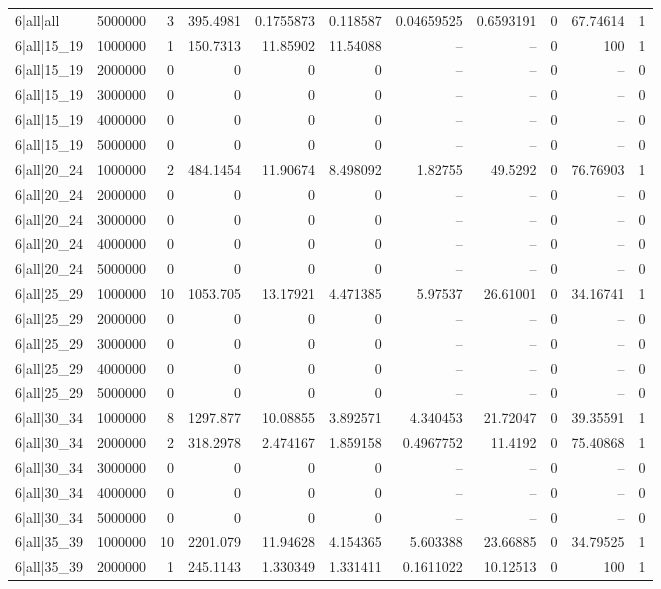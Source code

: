 \begin{tabular}{lrrrrrrrrrr}
6|all|all & 5000000 & 3 & 395.4981 & 0.1755873 & 0.118587 & 0.04659525 & 0.6593191 & 0 & 67.74614 & 1 \\
6|all|15\_19 & 1000000 & 1 & 150.7313 & 11.85902 & 11.54088 & -- & -- & 0 & 100 & 1 \\
6|all|15\_19 & 2000000 & 0 & 0 & 0 & 0 & -- & -- & 0 & -- & 0 \\
6|all|15\_19 & 3000000 & 0 & 0 & 0 & 0 & -- & -- & 0 & -- & 0 \\
6|all|15\_19 & 4000000 & 0 & 0 & 0 & 0 & -- & -- & 0 & -- & 0 \\
6|all|15\_19 & 5000000 & 0 & 0 & 0 & 0 & -- & -- & 0 & -- & 0 \\
6|all|20\_24 & 1000000 & 2 & 484.1454 & 11.90674 & 8.498092 & 1.82755 & 49.5292 & 0 & 76.76903 & 1 \\
6|all|20\_24 & 2000000 & 0 & 0 & 0 & 0 & -- & -- & 0 & -- & 0 \\
6|all|20\_24 & 3000000 & 0 & 0 & 0 & 0 & -- & -- & 0 & -- & 0 \\
6|all|20\_24 & 4000000 & 0 & 0 & 0 & 0 & -- & -- & 0 & -- & 0 \\
6|all|20\_24 & 5000000 & 0 & 0 & 0 & 0 & -- & -- & 0 & -- & 0 \\
6|all|25\_29 & 1000000 & 10 & 1053.705 & 13.17921 & 4.471385 & 5.97537 & 26.61001 & 0 & 34.16741 & 1 \\
6|all|25\_29 & 2000000 & 0 & 0 & 0 & 0 & -- & -- & 0 & -- & 0 \\
6|all|25\_29 & 3000000 & 0 & 0 & 0 & 0 & -- & -- & 0 & -- & 0 \\
6|all|25\_29 & 4000000 & 0 & 0 & 0 & 0 & -- & -- & 0 & -- & 0 \\
6|all|25\_29 & 5000000 & 0 & 0 & 0 & 0 & -- & -- & 0 & -- & 0 \\
6|all|30\_34 & 1000000 & 8 & 1297.877 & 10.08855 & 3.892571 & 4.340453 & 21.72047 & 0 & 39.35591 & 1 \\
6|all|30\_34 & 2000000 & 2 & 318.2978 & 2.474167 & 1.859158 & 0.4967752 & 11.4192 & 0 & 75.40868 & 1 \\
6|all|30\_34 & 3000000 & 0 & 0 & 0 & 0 & -- & -- & 0 & -- & 0 \\
6|all|30\_34 & 4000000 & 0 & 0 & 0 & 0 & -- & -- & 0 & -- & 0 \\
6|all|30\_34 & 5000000 & 0 & 0 & 0 & 0 & -- & -- & 0 & -- & 0 \\
6|all|35\_39 & 1000000 & 10 & 2201.079 & 11.94628 & 4.154365 & 5.603388 & 23.66885 & 0 & 34.79525 & 1 \\
6|all|35\_39 & 2000000 & 1 & 245.1143 & 1.330349 & 1.331411 & 0.1611022 & 10.12513 & 0 & 100 & 1 \\

\end{tabular}
